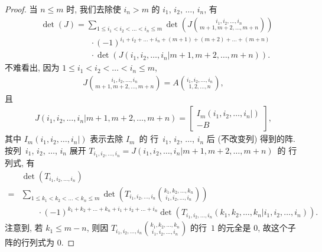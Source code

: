 \begin{proof}
    当 \(n \leq m\) 时,
    我们去除使 \(i_n > m\) 的
    \(i_1\), \(i_2\), \(\dots\), \(i_n\),
    有
    \begin{align*}
         &
        \det {(J)}
        = \sum_{1 \leq i_1 < i_2 < \dots < i_n \leq m}
        {\det {\left(
                J\binom{i_1,i_2,\dots,i_n}{m+1,m+2,\dots,m+n}
                \right)}}
        \\
         &
        \qquad \qquad \qquad
        \cdot (-1)^{i_1 + i_2 + \dots + i_n
            + (m+1) + (m+2) + \dots + (m+n)}
        \\
         &
        \qquad \qquad \qquad
        \cdot \det {(J({i_1,i_2,\dots,i_n}|{m+1,m+2,\dots,m+n}))}.
    \end{align*}
    不难看出,
    因为 \(1 \leq i_1 < i_2 < \dots < i_n \leq m\),
    \begin{align*}
        J\binom{i_1,i_2,\dots,i_n}{m+1,m+2,\dots,m+n}
        = A\binom{i_1,i_2,\dots,i_n}{1,2,\dots,n},
    \end{align*}
    且
    \begin{align*}
        J({i_1,i_2,\dots,i_n}|{m+1,m+2,\dots,m+n})
        =
        \begin{bmatrix}
            I_m (i_1,i_2,\dots,i_n|) \\
            -B
        \end{bmatrix},
    \end{align*}
    其中
    \(I_m (i_1,i_2,\dots,i_n|)\)
    表示去除 \(I_m\)~的%
    行~\(i_1\), \(i_2\), \(\dots\), \(i_n\)
    后 (不改变列) 得到的阵.
    按列~\(i_1\), \(i_2\), \(\dots\), \(i_n\) 展开
    \(T_{i_1,i_2,\dots,i_n}
    = J({i_1,i_2,\dots,i_n}|{m+1,m+2,\dots,m+n})\)~的%
    行列式, 有
    \begin{align*}
             & \det {(T_{i_1,i_2,\dots,i_n})}
        \\
        = {} &
        \sum_{1 \leq k_1 < k_2 < \dots < k_n \leq m}
        {\det {\left(
                T_{i_1,i_2,\dots,i_n}
                \binom{k_1, k_2, \dots, k_n}{i_1, i_2, \dots, i_n}
                \right)}}
        \\
             &
        \qquad
        \cdot (-1)^{k_1 + k_2 + \dots + k_n
            + i_1 + i_2 + \dots + i_n}
        \det {(T_{i_1,i_2,\dots,i_n}
        ({k_1,k_2,\dots,k_n}|{i_1,i_2,\dots,i_n}))}.
    \end{align*}
    注意到, 若 \(k_1 \leq m-n\),
    则因 \(\displaystyle T_{i_1,i_2,\dots,i_n}
    \binom{k_1,k_2,\dots,k_n}{i_1,i_2,\dots,i_n}\)
    的行~\(1\) 的元全是 \(0\),
    故这个子阵的行列式为 \(0\).

\end{proof}
